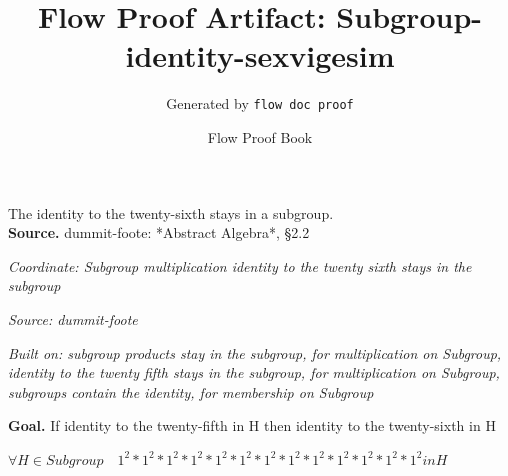 \documentclass[11pt]{article}
\title{Flow Proof Artifact: Subgroup-identity-sexvigesim}
\author{Generated by \texttt{flow doc proof}}
\date{Flow Proof Book}
\theoremstyle{definition}
\begin{document}
\maketitle
The identity to the twenty-sixth stays in a subgroup.\\[0.5em]
\textbf{Source.} dummit-foote: *Abstract Algebra*, §2.2\\[0.5em]
\bigskip
{}\par
\smallskip\noindent\textit{Coordinate: Subgroup \cdot multiplication \cdot identity to the twenty sixth stays in the subgroup}\par
\smallskip\noindent\textit{Source: dummit-foote}\par
\smallskip\noindent\textit{Built on: subgroup products stay in the subgroup, for multiplication on Subgroup, identity to the twenty fifth stays in the subgroup, for multiplication on Subgroup, subgroups contain the identity, for membership on Subgroup}\par
\medskip
\noindent\textbf{Goal.} If identity to the twenty-fifth in H then identity to the twenty-sixth in H\par
\noindent$\displaystyle \forall H \in Subgroup\quad 1^{2} * 1^{2} * 1^{2} * 1^{2} * 1^{2} * 1^{2} * 1^{2} * 1^{2} * 1^{2} * 1^{2} * 1^{2} * 1^{2} * 1^{2} in H$\par
\medskip
\noindent
\end{document}
